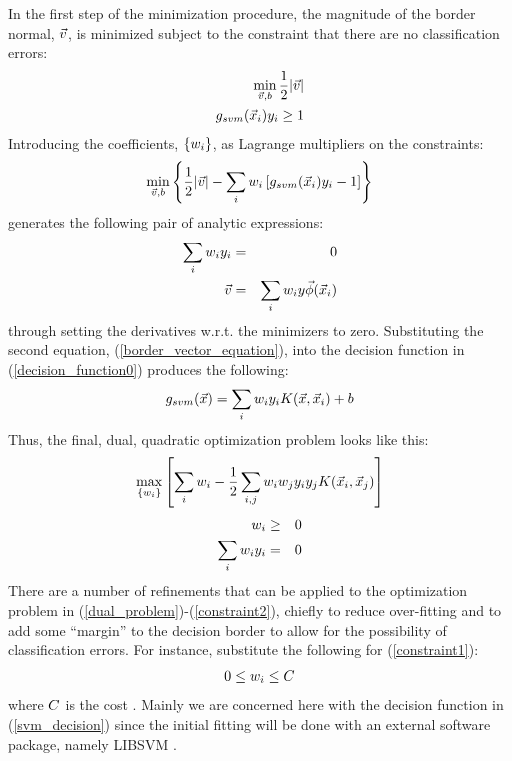 In the first step of the minimization procedure, 
the magnitude of the border normal, $\vec v$, 
is minimized subject to the constraint that there are no classification 
errors:
\begin{eqnarray}
	\min_{\vec v, b} \frac{1}{2} | \vec v | \\ \nonumber
	g_{svm}(\vec {x}_i) y_i \ge 1
\end{eqnarray}
Introducing the coefficients, $\lbrace w_i \rbrace$, 
as Lagrange multipliers on the constraints:
\begin{equation}
	\min_{\vec v, b} \left \lbrace \frac{1}{2} | \vec v | - \sum_i w_i \left [ g_{svm}(\vec {x}_i) y_i -1 \right ] \right \rbrace
\end{equation}
generates the following pair of analytic expressions:
\begin{eqnarray}
	\sum_i w_i y_i & = & 0 \\
	\vec v & = & \sum_i w_i y \vec\phi(\vec {x}_i) \label{border_vector_equation}
\end{eqnarray}
through setting the derivatives w.r.t. the minimizers to zero.
Substituting the second equation, (\ref{border_vector_equation}),
into the decision function in (\ref{decision_function0}) produces the following:
\begin{equation}
	g_{svm}(\vec {x}) = \sum_i w_i y_i K (\vec {x}, \vec {x}_i) + b
	\label{svm_decision}
\end{equation}
Thus, the final, dual, quadratic optimization problem looks like this:
\begin{equation}
	\max_{\lbrace w_i \rbrace} \left [ \sum_i w_i 
	- \frac{1}{2} \sum_{i, j} w_i w_j y_i y_j K(\vec {x}_i, \vec {x}_j) \right ] \label{dual_problem}
\end{equation}
\begin{eqnarray}
	w_i & \ge & 0 \label{constraint1} \\
	\sum_i w_i y_i & = & 0 \label{constraint2}
\end{eqnarray}
There are a number of refinements that can be applied to the optimization
problem in (\ref{dual_problem})-(\ref{constraint2}), chiefly to reduce over-fitting and to add
some ``margin'' to the decision border to allow for the possibility of
classification errors.
For instance, substitute the following for (\ref{constraint1}):
\begin{equation}
 0 \le w_i \le C
 \label{svmcost}
\end{equation}
where $C$ is the cost \citep{Mueller_etal2001}.
Mainly we are concerned here with the decision
function in (\ref{svm_decision}) since the initial fitting will be done with
an external software package, namely LIBSVM \citep{Chang_Lin2011}.

